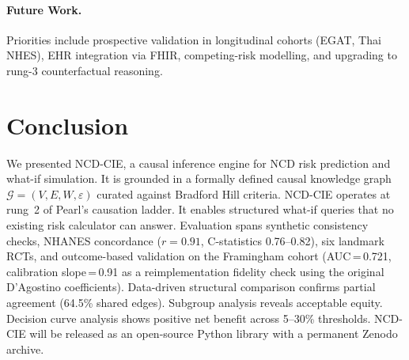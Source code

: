 \documentclass[runningheads]{llncs}
\begin{document}
\paragraph{Future Work.}
Priorities include prospective validation in longitudinal cohorts
(EGAT, Thai NHES), EHR integration via FHIR, competing-risk
modelling, and upgrading to rung-3 counterfactual reasoning.

\section{Conclusion}\label{sec:conclusion}

We presented NCD-CIE, a causal inference engine for NCD risk
prediction and what-if simulation.
It is grounded in a formally defined causal knowledge graph
$\mathcal{G} = (V, E, W, \varepsilon)$ curated against Bradford Hill
criteria.
NCD-CIE operates at rung~2 of Pearl's causation ladder.
It enables structured what-if queries that no existing risk
calculator can answer.
Evaluation spans synthetic consistency checks, NHANES concordance
($r = 0.91$, C-statistics 0.76--0.82), six landmark RCTs, and
outcome-based validation on the Framingham cohort
(AUC\,=\,0.721, calibration slope\,=\,0.91 as a reimplementation
fidelity check using the original D'Agostino coefficients).
Data-driven structural comparison confirms partial agreement
(64.5\% shared edges).
Subgroup analysis reveals acceptable equity.
Decision curve analysis shows positive net benefit across 5--30\%
thresholds.
NCD-CIE will be released as an open-source Python library with a
permanent Zenodo archive.
\end{document}
